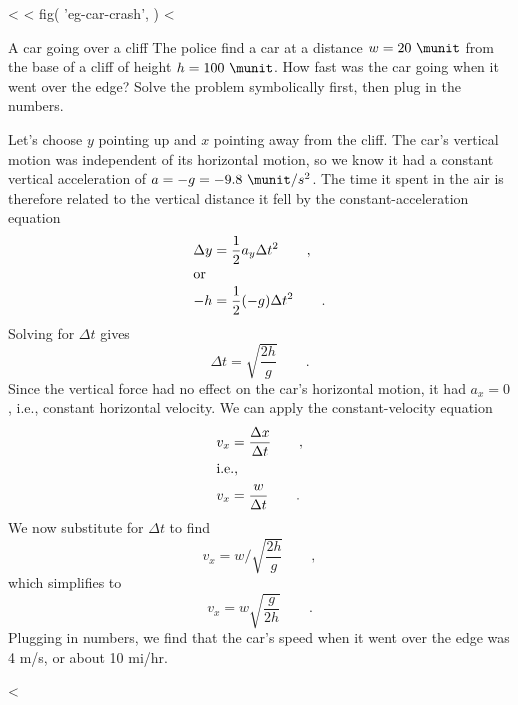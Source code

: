 <%
<%
  fig(
    'eg-car-crash',
  )
<%
\begin{eg}{A car going over a cliff}\label{eg:car-crash}
\egquestion The police find a car at a distance $w=20\ \munit$ from
the base of a cliff of height $h=100\ \munit$. How fast was the car
going when it went over the edge? Solve the problem
symbolically first, then plug in the numbers.

\eganswer Let's choose $y$ pointing up and $x$ pointing away
from the cliff. The car's vertical motion was independent of
its horizontal motion, so we know it had a constant vertical
acceleration of $a=-g=-9.8\ \munit/s^2$. The time it spent in
the air is therefore related to the vertical distance it
fell by the constant-acceleration equation
\begin{align*}
  \Delta y &= \frac{1}{2}a_y \Delta t^2     \qquad   , \\
\intertext{or}
  -h &= \frac{1}{2}(-g)\Delta t^2     \qquad   .
\end{align*}
Solving for $\Delta t$ gives
\begin{equation*}
  \Delta t = \sqrt{\frac{2h}{g}}     \qquad   .
\end{equation*}
Since the vertical force had no effect on the car's
horizontal motion, it had $a_x=0$, i.e., constant horizontal
velocity. We can apply the constant-velocity equation
\begin{align*}
       v_x &= \frac{\Delta x}{\Delta t} \qquad   , \\
\intertext{i.e.,}
       v_x &= \frac{w}{\Delta t} \qquad   .
\end{align*}
We now substitute for $\Delta t$ to find
\begin{equation*}
      v_x = w / \sqrt{\frac{2h}{g}} \qquad   ,
\end{equation*}
which simplifies to
\begin{equation*}
      v_x = w \sqrt{\frac{g}{2h}} \qquad   .
\end{equation*}
Plugging in numbers, we find that the car's speed when it
went over the edge was 4 m/s, or about 10 mi/hr.
\end{eg}

<%

